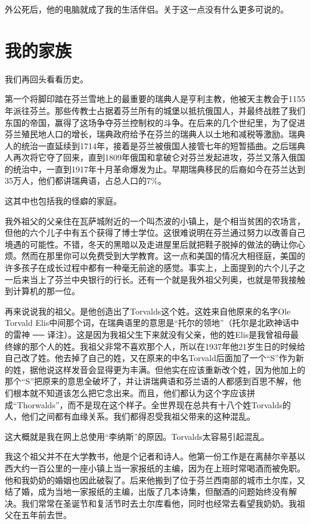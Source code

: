外公死后，他的电脑就成了我的生活伴侣。关于这一点没有什么更多可说的。

 
\section{我的家族}

我们再回头看看历史。

第一个将脚印踏在芬兰雪地上的最重要的瑞典人是亨利主教，他被天主教会于1155年派往芬兰。那些传教士占据着芬兰所有的城堡以抵抗俄国人，并最终战胜了我们东国的帝国，赢得了这场争夺芬兰控制权的斗争。在后来的几个世纪里，为了促进芬兰殖民地人口的增长，瑞典政府给予在芬兰的瑞典人以土地和减税等激励。瑞典人的统治一直延续到1714年，接着是芬兰被俄国人接管七年的短暂插曲。之后瑞典人再次将它夺了回来，直到1809年俄国和拿破仑对芬兰发起进攻，芬兰又落入俄国的统治中，一直到1917年十月革命爆发为止。早期瑞典移民的后裔如今在芬兰达到35万人，他们都讲瑞典语，占总人口的7\%。

这其中也包括我的怪癖的家庭。

我外祖父的父亲住在瓦萨城附近的一个叫杰波的小镇上，是个相当贫困的农场言，但他的六个儿子中有五个获得了博士学位。这很难说明在芬兰通过努力以改善自己境遇的可能性。不错，冬天的黑暗以及走进屋里后就把鞋子脱掉的做法的确让你心烦。然而在那里你可以免费受到大学教育。这一点和美国的情况大相径庭，美国的许多孩子在成长过程中都有一种毫无前途的感觉。事实上，上面提到的六个儿子之一后来当上了芬兰中央银行的行长。还有一个就是我外祖父列奥，也就是带我接触到计算机的那一位。

再来说说我的祖父。是他创造出了Torvalds这个姓。这姓来自他原来的名字Ole Torvald Elis中间那个词，在瑞典语里的意思是“托尔的领地”（托尔是北欧神话中的雷神 ── 译注）。这是因为我祖父生下来就没有父亲，他的姓Elis是我曾祖母最终嫁的那个人的姓。我祖父非常不喜欢那个人，所以在1937年他21岁生日的时候给自己改了姓。他去掉了自己的姓，又在原来的中名Torvald后面加了一个“S”作为新的姓，据他说这样发音会显得更为丰满。但他实在应该重新改个姓，因为他加上的那个“S”把原来的意思全破坏了，并让讲瑞典语和芬兰语的人都感到百思不解，他们根本就不知道该怎么把它念出来。而且，他们都认为这个字应该拼成“Thorwalds”，而不是现在这个样子。全世界现在总共有十八个姓Torvalds的人，他们之间都有血缘关系。我们都得忍受我祖父带来的这种混乱。

这大概就是我在网上总使用“李纳斯”的原因。Torvalds太容易引起混乱。

我这个祖父并不在大学教书，他是个记者和诗人。他第一份工作是在离赫尔辛基以西大约一百公里的一座小镇上当一家报纸的主编，因为在上班时常喝酒而被免职。他和我奶奶的婚姻也因此破裂了。后来他搬到了位于芬兰西南部的城市土尔库，又结了婚，成为当地一家报纸的主编，出版了几本诗集，但酗酒的问题始终没有解决。我们常常在圣诞节和复活节时去土尔库看他，同时也经常去看望我奶奶。我祖父在五年前去世。

